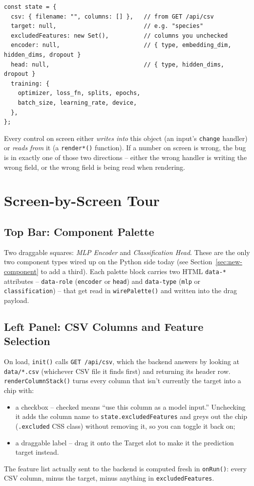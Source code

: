 \documentclass[11pt]{article}
\begin{document}
\begin{lstlisting}
const state = {
  csv: { filename: "", columns: [] },   // from GET /api/csv
  target: null,                         // e.g. "species"
  excludedFeatures: new Set(),          // columns you unchecked
  encoder: null,                        // { type, embedding_dim, hidden_dims, dropout }
  head: null,                           // { type, hidden_dims, dropout }
  training: {
    optimizer, loss_fn, splits, epochs,
    batch_size, learning_rate, device,
  },
};
\end{lstlisting}

Every control on screen either \emph{writes into} this object (an input's
\lstinline{change} handler) or \emph{reads from} it (a
\lstinline{render*()} function). If a number on screen is wrong, the bug is
in exactly one of those two directions -- either the wrong handler is writing
the wrong field, or the wrong field is being read when rendering.

\section{Screen-by-Screen Tour}

\subsection{Top Bar: Component Palette}
Two draggable squares: \emph{MLP Encoder} and \emph{Classification Head}.
These are the only two component types wired up on the Python side today
(see Section~\ref{sec:new-component} to add a third). Each palette block
carries two HTML \lstinline{data-*} attributes -- \lstinline{data-role}
(\lstinline{encoder} or \lstinline{head}) and \lstinline{data-type}
(\lstinline{mlp} or \lstinline{classification}) -- that get read in
\lstinline{wirePalette()} and written into the drag payload.

\subsection{Left Panel: CSV Columns and Feature Selection}
On load, \lstinline{init()} calls \lstinline{GET /api/csv}, which the
backend answers by looking at \lstinline{data/*.csv} (whichever CSV file it
finds first) and returning its header row. \lstinline{renderColumnStack()}
turns every column that isn't currently the target into a chip with:
\begin{itemize}
  \item a checkbox -- checked means ``use this column as a model input.''
  Unchecking it adds the column name to \lstinline{state.excludedFeatures}
  and greys out the chip (\lstinline{.excluded} CSS class) without removing
  it, so you can toggle it back on;
  \item a draggable label -- drag it onto the Target slot to make it the
  prediction target instead.
\end{itemize}
The feature list actually sent to the backend is computed fresh in
\lstinline{onRun()}: every CSV column, minus the target, minus anything in
\lstinline{excludedFeatures}.
\end{document}

